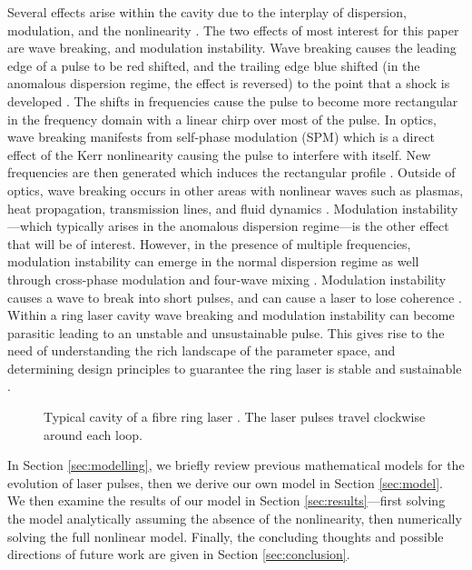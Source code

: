 \documentclass[9pt,twocolumn,twoside]{osajnl}
\begin{document}
Several effects arise within the cavity due to the interplay of dispersion, modulation, and the nonlinearity \cite{bohun2015, coen1997, lapre2019, shao2019, woodward2018}. The two effects of most interest for this paper are wave breaking, and modulation instability. Wave breaking causes the leading edge of a pulse to be red shifted, and the trailing edge blue shifted (in the anomalous dispersion regime, the effect is reversed) to the point that a shock is developed \cite{anderson1992, rothenberg1989a, rothenberg1989b, tomlinson1984, tomlinson1985}. The shifts in frequencies cause the pulse to become more rectangular in the frequency domain with a linear chirp over most of the pulse. In optics, wave breaking manifests from self-phase modulation (SPM) which is a direct effect of the Kerr nonlinearity causing the pulse to interfere with itself. New frequencies are then generated which induces the rectangular profile \cite{agrawal2013, mollenauer1980, woodward2018}. Outside of optics, wave breaking occurs in other areas with nonlinear waves such as plasmas, heat propagation, transmission lines, and fluid dynamics \cite{rothenberg1989b}. Modulation instability---which typically arises in the anomalous dispersion regime---is the other effect that will be of interest. However, in the presence of multiple frequencies, modulation instability can emerge in the normal dispersion regime as well through cross-phase modulation and four-wave mixing \cite{agrawal1987, agrawal1989, agrawal2013, haelterman1992}. Modulation instability causes a wave to break into short pulses, and can cause a laser to lose coherence \cite{agrawal1987, coen1997, haelterman1992}. Within a ring laser cavity wave breaking and modulation instability can become parasitic leading to an unstable and unsustainable pulse. This gives rise to the need of understanding the rich landscape of the parameter space, and determining design principles to guarantee the ring laser is stable and sustainable \cite{bohun2015, burgoyneemail, finot2008, lapre2019, woodward2018}.

\begin{figure}[tbp]
	\centering
	
	\caption{Typical cavity of a fibre ring laser \cite{burgoyne2014, chung2017, lapre2019, shao2019, tang2014}. The laser pulses travel clockwise around each loop.}
	\label{fig:cavity}
\end{figure}

In Section \ref{sec:modelling}, we briefly review previous mathematical models for the evolution of laser pulses, then we derive our own model in Section \ref{sec:model}. We then examine the results of our model in Section \ref{sec:results}---first solving the model analytically assuming the absence of the nonlinearity, then numerically solving the full nonlinear model. Finally, the concluding thoughts and possible directions of future work are given in Section \ref{sec:conclusion}.
\end{document}
